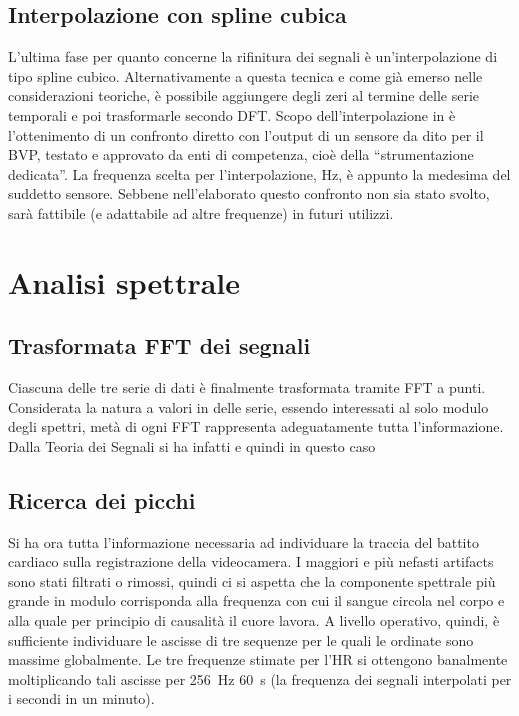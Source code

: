 	\subsection{Interpolazione con spline cubica}
L'ultima fase per quanto concerne la rifinitura dei segnali è un'interpolazione di tipo spline cubico. Alternativamente a questa tecnica e come già emerso nelle considerazioni teoriche, è possibile aggiungere degli zeri al termine delle serie temporali e poi trasformarle secondo DFT. Scopo dell'interpolazione in \cite{POH11} è l'ottenimento di un confronto diretto con l'output di un sensore da dito per il BVP, testato e approvato da enti di competenza, cioè della ``strumentazione dedicata''. La frequenza scelta per l'interpolazione,  Hz, è appunto la medesima del suddetto sensore. Sebbene nell'elaborato questo confronto non sia stato svolto, sarà fattibile (e adattabile ad altre frequenze) in futuri utilizzi.
\section{Analisi spettrale} %
	\subsection{Trasformata FFT dei segnali}
Ciascuna delle tre serie di  dati è finalmente trasformata tramite FFT a  punti. Considerata la natura a valori in  delle serie, essendo interessati al solo modulo degli spettri, metà di ogni FFT rappresenta adeguatamente tutta l'informazione. 
Dalla Teoria dei Segnali si ha infatti \cite{TDS:LEO}
 e quindi in questo caso 
	\subsection{Ricerca dei picchi}
Si ha ora tutta l'informazione necessaria ad individuare la traccia del battito cardiaco sulla registrazione della videocamera. I maggiori e più nefasti artifacts sono stati filtrati o rimossi, quindi ci si aspetta che la componente spettrale più grande in modulo corrisponda alla frequenza con cui il sangue circola nel corpo e alla quale per principio di causalità il cuore lavora. A livello operativo, quindi, è sufficiente individuare le ascisse di tre sequenze per le quali le ordinate sono massime globalmente. Le tre frequenze stimate per l'HR si ottengono banalmente moltiplicando tali ascisse per 256\, Hz \mymath{\cdot} 60\, s (la frequenza dei segnali interpolati per i secondi in un minuto).